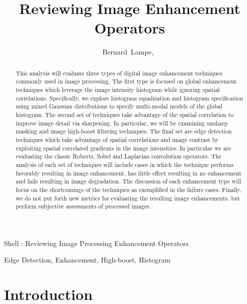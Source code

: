 \documentclass[journal]{IEEEtran}
\begin{document}
\title{Reviewing Image Enhancement Operators}

\author{Bernard~Lampe,~}

%
{Shell \MakeLowercase{\Lampe}: Reviewing Image Processing Enhancement Operators}

\maketitle

\begin{abstract}
This analysis will evaluate three types of digital image enhancement techniques commonly used in image processing. The first type is focused on global enhancement techniques which leverage the image intensity histogram while ignoring spatial correlations. Specifically, we explore histogram equalization and histogram specification using mixed Gaussian distributions to specify multi-modal models of the global histogram. The second set of techniques take advantage of the spatial correlation to improve image detail via sharpening. In particular, we will be examining unsharp masking and image high-boost filtering techniques. The final set are edge detection techniques which take advantage of spatial correlations and image contrast by exploiting spatial correlated gradients in the image intensities. In particular we are evaluating the classic Roberts, Sobel and Laplacian convolution operators. The analysis of each set of techniques will include cases in which the technique performs favorably resulting in image enhancement, has little effect resulting in no enhancement and fails resulting in image degradation. The discussion of each enhancement type will focus on the shortcomings of the techniques as exemplified in the failure cases. Finally, we do not put forth new metrics for evaluating the resulting image enhancements, but perform subjective assessments of processed images.
\end{abstract}

\begin{IEEEkeywords}
Edge Detection, Enhancement, High-boost, Histogram
\end{IEEEkeywords}

\section{Introduction}
\end{document}
